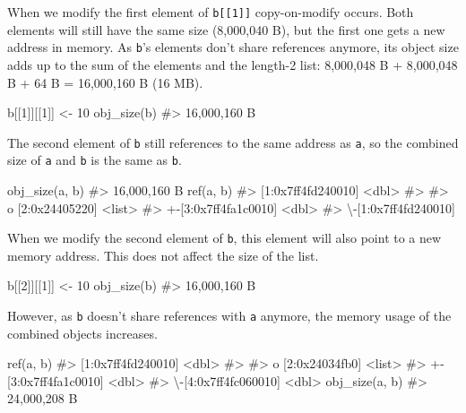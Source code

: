 \documentclass[
]{krantz}
\makeatletter
\newenvironment{Shaded}{\begin{snugshade}}{\end{snugshade}}
\newcommand{\CommentTok}[1]{\textcolor[rgb]{0.56,0.35,0.01}{\textit{#1}}}
\newcommand{\DecValTok}[1]{\textcolor[rgb]{0.00,0.00,0.81}{#1}}
\newcommand{\KeywordTok}[1]{\textcolor[rgb]{0.13,0.29,0.53}{\textbf{#1}}}
\newcommand{\NormalTok}[1]{#1}
\newcommand{\StringTok}[1]{\textcolor[rgb]{0.31,0.60,0.02}{#1}}
\newenvironment{kframe}{%
\medskip{}
\setlength{\fboxsep}{.8em}
 \def\at@end@of@kframe{}%
 \ifinner\ifhmode%
  \def\at@end@of@kframe{\end{minipage}}%
  \begin{minipage}{\columnwidth}%
 \fi\fi%
 \def\FrameCommand##1{\hskip\@totalleftmargin \hskip-\fboxsep
 \colorbox{shadecolor}{##1}\hskip-\fboxsep
     \hskip-\linewidth \hskip-\@totalleftmargin \hskip\columnwidth}%
 \MakeFramed {\advance\hsize-\width
   \@totalleftmargin\z@ \linewidth\hsize
   \@setminipage}}%
 {\par\unskip\endMakeFramed%
 \at@end@of@kframe}
\renewenvironment{Shaded}{\begin{kframe}}{\end{kframe}}
\renewcommand{\KeywordTok} [1]{\textcolor[rgb]{0.00,0.44,0.13}{{#1}}}
\renewcommand{\DecValTok}  [1]{\textcolor[rgb]{0.25,0.63,0.44}{{#1}}}
\renewcommand{\StringTok}  [1]{\textcolor[rgb]{0.25,0.44,0.63}{{#1}}}
\renewcommand{\CommentTok} [1]{\textcolor[rgb]{0.38,0.63,0.69}{{#1}}}
\renewcommand{\NormalTok}  [1]{{#1}}
\makeatother
\begin{document}
When we modify the first element of \texttt{b{[}{[}1{]}{]}} copy-on-modify occurs. Both elements will still have the same size (8,000,040 B), but the first one gets a new address in memory. As \texttt{b}'s elements don't share references anymore, its object size adds up to the sum of the elements and the length-2 list: 8,000,048 B + 8,000,048 B + 64 B = 16,000,160 B (16 MB).

\begin{Shaded}
\begin{Highlighting}[]
\NormalTok{b[[}\DecValTok{1}\NormalTok{]][[}\DecValTok{1}\NormalTok{]] <-}\StringTok{ }\DecValTok{10}
\KeywordTok{obj_size}\NormalTok{(b) }
\CommentTok{#> 16,000,160 B}
\end{Highlighting}
\end{Shaded}

The second element of \texttt{b} still references to the same address as \texttt{a}, so the combined size of \texttt{a} and \texttt{b} is the same as \texttt{b}.

\begin{Shaded}
\begin{Highlighting}[]
\KeywordTok{obj_size}\NormalTok{(a, b) }
\CommentTok{#> 16,000,160 B}
\KeywordTok{ref}\NormalTok{(a, b)}
\CommentTok{#> [1:0x7ff4fd240010] <dbl> }
\CommentTok{#>  }
\CommentTok{#> o [2:0x24405220] <list> }
\CommentTok{#> +-[3:0x7ff4fa1c0010] <dbl> }
\CommentTok{#> \textbackslash{}-[1:0x7ff4fd240010]}
\end{Highlighting}
\end{Shaded}

When we modify the second element of \texttt{b}, this element will also point to a new memory address. This does not affect the size of the list.

\begin{Shaded}
\begin{Highlighting}[]
\NormalTok{b[[}\DecValTok{2}\NormalTok{]][[}\DecValTok{1}\NormalTok{]] <-}\StringTok{ }\DecValTok{10}
\KeywordTok{obj_size}\NormalTok{(b) }
\CommentTok{#> 16,000,160 B}
\end{Highlighting}
\end{Shaded}

However, as \texttt{b} doesn't share references with \texttt{a} anymore, the memory usage of the combined objects increases.

\begin{Shaded}
\begin{Highlighting}[]
\KeywordTok{ref}\NormalTok{(a, b)}
\CommentTok{#> [1:0x7ff4fd240010] <dbl> }
\CommentTok{#>  }
\CommentTok{#> o [2:0x24034fb0] <list> }
\CommentTok{#> +-[3:0x7ff4fa1c0010] <dbl> }
\CommentTok{#> \textbackslash{}-[4:0x7ff4fc060010] <dbl>}
\KeywordTok{obj_size}\NormalTok{(a, b) }
\CommentTok{#> 24,000,208 B}
\end{Highlighting}
\end{Shaded}
\end{document}

